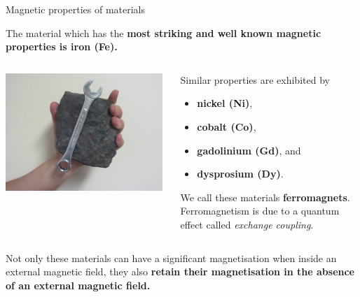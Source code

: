 
%
%
%

\begin{frame}{Magnetic properties of materials}

The material which has the {\bf most striking and well known magnetic properties is iron (Fe).}

\begin{columns}
  \begin{column}{0.48\textwidth}
    \begin{center}
      \includegraphics[width=0.98\textwidth]{./images/photos/lodestone_1.jpg}\\
    \end{center}
  \end{column}
  \begin{column}{0.52\textwidth}
        Similar properties are exhibited by
        \begin{itemize}
            \item {\bf nickel (Ni)}, \\
            \item {\bf cobalt (Co)}, \\
            \item {\bf gadolinium (Gd)}, and \\
            \item {\bf dysprosium (Dy)}. \\
        \end{itemize}
        \vspace{0.2cm}
        We call these materials {\bf ferromagnets}.
        Ferromagnetism is due to a quantum effect called
        {\em exchange coupling}.
  \end{column}
\end{columns}

\vspace{0.4cm}

Not only these materials can have a significant magnetisation when inside an external magnetic field,
they also {\bf retain their magnetisation in the absence of an external magnetic field.}

\end{frame}

